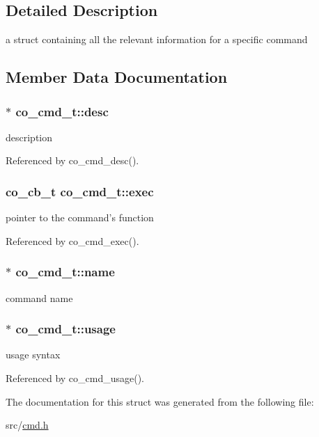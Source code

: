 \subsection{Detailed Description}
a struct containing all the relevant information for a specific command 

\subsection{Member Data Documentation}
\hypertarget{structco__cmd__t_a97bb000840489763d726b1e81181a5f5}{
\subsubsection[{desc}]{$\ast$ co\+\_\+cmd\+\_\+t\+::desc}}\label{structco__cmd__t_a97bb000840489763d726b1e81181a5f5}
description 

Referenced by co\+\_\+cmd\+\_\+desc().

\hypertarget{structco__cmd__t_add04e691f5afa12a19ecc870860d9e82}{
\subsubsection[{exec}]{\setlength{\rightskip}{0pt plus 5cm}co\+\_\+cb\+\_\+t co\+\_\+cmd\+\_\+t\+::exec}}\label{structco__cmd__t_add04e691f5afa12a19ecc870860d9e82}
pointer to the command's function 

Referenced by co\+\_\+cmd\+\_\+exec().

\hypertarget{structco__cmd__t_ab6400b20e7ea4d71d79c421f57b18862}{
\subsubsection[{name}]{$\ast$ co\+\_\+cmd\+\_\+t\+::name}}\label{structco__cmd__t_ab6400b20e7ea4d71d79c421f57b18862}
command name \hypertarget{structco__cmd__t_af73f4d544979225b4f5ef4fe22f855ef}{
\subsubsection[{usage}]{$\ast$ co\+\_\+cmd\+\_\+t\+::usage}}\label{structco__cmd__t_af73f4d544979225b4f5ef4fe22f855ef}
usage syntax 

Referenced by co\+\_\+cmd\+\_\+usage().



The documentation for this struct was generated from the following file\+:\begin{DoxyCompactItemize}
\item 
src/\hyperlink{cmd_8h}{cmd.\+h}\end{DoxyCompactItemize}
